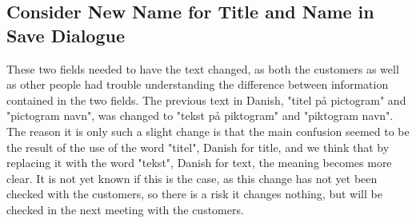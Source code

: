 \subsection{Consider New Name for Title and Name in Save Dialogue}
These two fields needed to have the text changed, as both the customers as well as other people had trouble understanding the difference between information contained in the two fields.
The previous text in Danish, "titel på pictogram" and "pictogram navn", was changed to "tekst på piktogram" and "piktogram navn". 
The reason it is only such a slight change is that the main confusion seemed to be the result of the use of the word "titel", Danish for title, and we think that by replacing it with the word "tekst", Danish for text, the meaning becomes more clear. 
It is not yet known if this is the case, as this change has not yet been checked with the customers, so there is a risk it changes nothing, but will be checked in the next meeting with the customers.